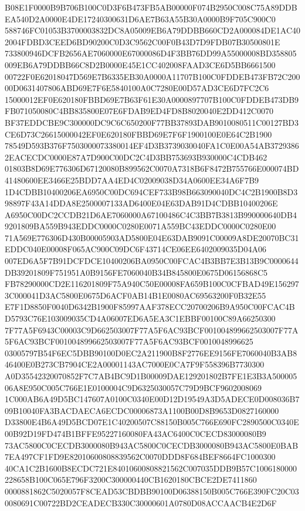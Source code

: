 \documentclass[UTF8,fontset=fandol,zihao=-4,a4paper]{ctexart}
\begin{document}
{{B08E1F0000B9B706B100C0D3F6B473FB5AB00000F074B2950C008C75A89DDBEA540D2A0000E4DE17240300631D6AE7B63A55B30A0000B9F705C900C0
588746FC01053B3700003832DC8A05009EB6A79DDBB660CD2A000084DE1AC402004FDBD3CEED6BD90200C0D3C9562C00F0B43D7D9FDB07B30500801E
733800946DCFB2656AE7060000E67000086D4F3BB76DD99A55000008BD358805009EB6A79DDBB66C8D2B0000E45E1CC402008FAAD3CE6D5BB6661500
00722F0E62018047D569E7B6335EB30A0000A11707B100C0FDDEB473FB72C20000D0631407806ABD69E7F6E5840100A0C7280E00D57AD3CE6D7FC2C6
15000012EF0E620180FBBD69E7B63F61E30A0000897707B100C0FDDEB473DB9FB071050080C4BB835800E07E6FDAB9ED4FD8B8020040E2DD412C0070
BF37EDDCBE9C300000DC9C6C650200F77BB37893DAB9010080511C00127BD3CE6D73C26615000042EF0E620180FBBD69E7F6F1900100E0E64C2B1900
78549D593B376F7503000073380014EF4D3B3739030040FA1C0E00A54AB37293862EACECDC0000E87A7D900C00DC2C4D3BB753693B930000C4CDB462
01803B8D69E776306D67120080B899562C0070A7318B6F8472B755766E000074BD41480600EE3466E25BDD7AA4ED4C02009038D34A0600EE34A6F7B9
1D4CDBB10400206EA6950C00DC694CEF733B98B663090040DC4C2B1900B8D398897F43A14DDA8E2500007133AD6400E04E63DAB91D4CDBB10400206E
A6950C00DC2CCDB21D6AE7060000A67100486C4C3BB7B3813B990000640DB49201809BA559B943EDDC0000C0280E0071A559BC43EDDC0000C0280E00
71A569E776306D430B00005903AD5800E04E63DAB9091C00009A8DE20070BC31EDDC040E00008F065AC900C09DC6F43714CE06EE6402009035D04A06
007ED6A5F7B91DCFDCE10400206BA0950C00FCAC4B3BB7E3B13B9C0000644DB39201809F751951A0B9156FE7060040B34B845800E0675D06156868C5
FB78290000CD2E116201809F75A940C50E00008FA659B100C0CFBAD49E1562973C000041D3AC5800E0675D6ACF0AB14B1E0080AC69563200F0B32E55
E7F1D8850F0040D6342B1900F85997AAF378ECC20700206B9A950C00FCAC4BD5793C76E103009035CD4A06007ED6A5EA3C1EBBF00100C89A66250300
7F77A5F6943C00003C9D662503007F77A5F6AC93BCF001004899662503007F77A5F6AC93BCF001004899662503007F77A5F6AC93BCF0010048996625
03005797B54F6EC5DBB90100D0EC2A211900B8F2776EE9156FE7060040B3AB846400E0B273CB7904CE2A00001143AC7000E0CA7F9F558396B7730300
A0D35542320070852F7C7AB4BC9D1B00009DAE129201802B7FE1E3B3A50000506A8E950C005C766E1E0100004C9D6325030057C79D9BCF9602008069
1C000AB6A49D5BC147607A0100C0340E00D12D19549A3D5ADECE0D008036B709B10040FA3BACDAECA6ECDC00006873A1100B00D8B9653D0827160000
D33800E4B6A49D5BCD07E1C40200507C88150B005C766E690FC2890500C0340E00B92D19FD474B1BFFE95227160080FA43AC6400C0CECD83000080B9
73AC5800C0CECDB3000080B943AC5800C0CECDB3000080B943AC5800E0BAB7EA497CF1FD9E82010600808839562C0070DDD8F684BEF8664FC1000300
40CA1C2B1600B8ECDC721E84010600808821562C007035DDB9B57C1006180000228658B100C065E796F3200C300000440CB1620180CBCE2DE7411860
0000881862C5020057F8CEAD53CBDBB90100D06388150B005C766E390FC20C030080691C00722BD2CEADECB330C30000601A0780D08ACCAACB4E2D6F
}}
\end{document}
